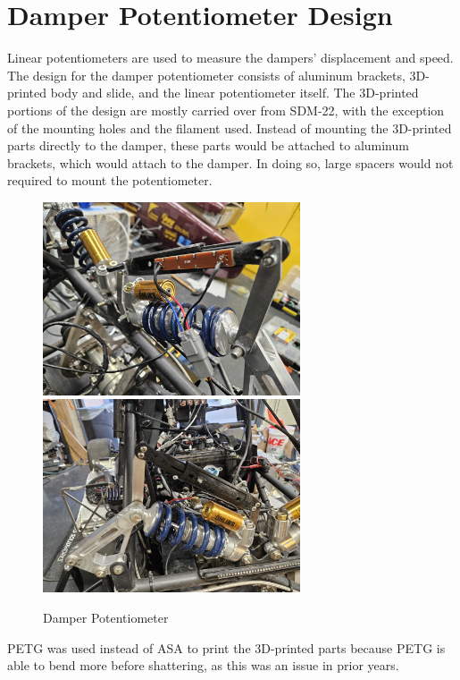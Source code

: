 \section{Damper Potentiometer Design}
Linear potentiometers are used to measure the dampers' displacement and speed.
The design for the damper potentiometer consists of aluminum brackets, 3D-printed body and slide, and the linear potentiometer itself.
The 3D-printed portions of the design are mostly carried over from SDM-22, with the exception of the mounting holes and the filament used.
Instead of mounting the 3D-printed parts directly to the damper, these parts would be attached to aluminum brackets, which would attach to the damper.
In doing so, large spacers would not required to mount the potentiometer.
\begin{figure}[H]
    \centering
    \includegraphics[width=3in]{images/pots.jpg}
    \includegraphics[width=3in]{images/potu.jpg}
    \caption{Damper Potentiometer}
    \label{fig:dp}
\end{figure}
\vspace{1em}

PETG was used instead of ASA to print the 3D-printed parts because PETG is able to bend more before shattering, as this was an issue in prior years.

